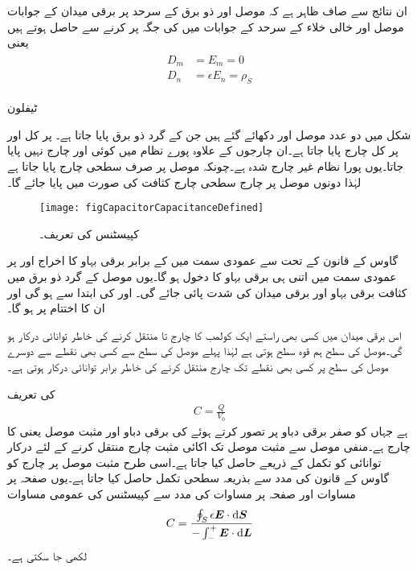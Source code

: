 ان نتائج سے صاف  ظاہر ہے کہ موصل اور ذو برق کے سرحد پر برقی میدان کے جوابات موصل اور خالی خلاء کے سرحد کے جوابات میں  کی جگہ  پر کرنے سے حاصل ہوتے ہیں یعنی
\begin{gather}
\begin{aligned}
D_m&=E_m=0\\
D_n&=\epsilon E_n=\rho_S
\end{aligned}
\end{gather}

ٹیفلون


شکل  میں دو عدد موصل  اور   دکھائے گئے ہیں جن کے گرد ذو برق پایا جاتا ہے۔ پر کل  اور  پر کل  چارج پایا جاتا ہے۔ان چارجوں کے علاوہ پورے نظام میں کوئی اور چارج نہیں پایا جاتا۔یوں پورا نظام غیر چارج شدہ ہے۔چونکہ موصل پر صرف سطحی چارج پایا جاتا ہے لہٰذا دونوں موصل پر چارج سطحی چارج کثافت کی صورت میں پایا جائے گا۔

\begin{figure}
\centering
\texttt{[image: figCapacitorCapacitanceDefined]}
\caption{کپیسٹنس کی تعریف۔}
\label{شکل_کپیسٹر_کپیسٹنس_کی_تعریف}
\end{figure}

گاوس کے قانون کے تحت  سے عمودی سمت میں  کے برابر برقی بہاو کا اخراج  اور   پر عمودی سمت میں اتنی ہی برقی بہاو کا دخول ہو گا۔یوں موصل کے گرد ذو برق میں کثافت برقی بہاو  اور برقی میدان کی شدت  پائی جائے گی۔ اور  کی ابتدا  سے ہو گی اور ان کا اختتام  پر ہو گا۔

اس برقی میدان میں  کسی بھی راستے  ایک کولمب کا چارج  تا  منتقل کرنے کی خاطر  توانائی درکار ہو گی۔موصل کی سطح ہم قوہ سطح ہوتی ہے لہٰذا پہلے موصل کی سطح سے کسی بھی نقطے سے دوسرے  موصل کی سطح پر کسی بھی نقطے تک چارج منتقل کرنے کی خاطر برابر توانائی درکار ہوتی ہے۔

  کی تعریف
\begin{align}
C=\frac{Q}{V_0}
\end{align}
ہے جہاں  کو صفر برقی دباو پر تصور کرتے ہوئے  کی برقی دباو  اور  مثبت موصل یعنی  کا چارج  ہے۔منفی موصل سے مثبت موصل تک اکائی مثبت چارج منتقل کرنے کے لئے درکار توانائی  کو تکمل کے ذریعے حاصل کیا جاتا ہے۔اسی طرح مثبت موصل پر چارج   کو گاوس کے قانون کی مدد سے بذریعہ سطحی تکمل  حاصل  کیا جاتا ہے۔یوں صفحہ  پر مساوات  اور صفحہ  پر مساوات  کی مدد سے کپیسٹنس کی عمومی مساوات
\begin{align}
C=\frac{\oint_S  \epsilon \kvec{E} \cdot \dif \kvec{S} }{-\int_{-}^{+} \kvec{E} \cdot \dif \kvec{L}}
\end{align}
لکھی جا سکتی ہے۔

